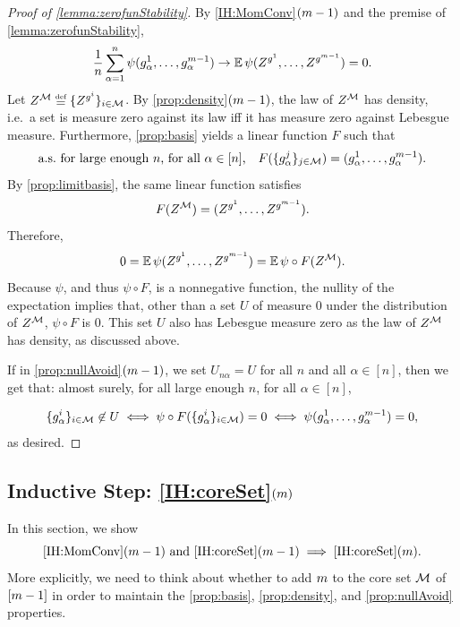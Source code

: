 \documentclass[main.tex]{subfiles}
\begin{document}
\begin{proof}[Proof of \cref{lemma:zerofunStability}]
By \ref{IH:MomConv}$(m-1)$ and the premise of \cref{lemma:zerofunStability},
\begin{align*}
\frac{1}{n} \sum_{\alpha = 1}^n \psi(g^1_\alpha, \ldots, g^{m-1}_\alpha) \to \operatorname*{\mathbb{E}} \psi(Z^{g^1}, \ldots, Z^{g^{m-1}}) = 0.
\end{align*}
Let $\Zz^\coreset \defeq \{\Zz^{g^i}\}_{i \in \coreset}$.
By \ref{prop:density}$(m-1)$, the law of $Z^{\mathcal{M}}$ has density, i.e.\ a set is measure zero against its law iff it has measure zero against Lebesgue measure.
Furthermore, \ref{prop:basis} yields a linear function $F$ such that
\[\text{a.s.\ for large enough $n$, for all $\alpha \in [n]$,}\quad
F(\{g^j_\alpha\}_{j \in \mathcal{M}}) = (g^1_\alpha, \ldots, g^{m-1}_\alpha)
.
\]
By \cref{prop:limitbasis}, the same linear function satisfies
\[F(Z^{\mathcal{M}}) = (Z^{g^1}, \ldots, Z^{g^{m-1}})
.\]
Therefore,
\begin{equation*}
0 = \operatorname*{\mathbb{E}} \psi(Z^{g^1}, \ldots, Z^{g^{m-1}})
= \operatorname*{\mathbb{E}} \psi \circ F(Z^{\mathcal{M}})
.
\end{equation*}
Because $\psi$, and thus $\psi \circ F$, is a nonnegative function, the nullity of the expectation implies that, other than a set $U$ of measure 0 under the distribution of $Z^{\mathcal{M}}$, $\psi\circ F$ is 0.
This set $U$ also has Lebesgue measure zero as the law of $Z^{\mathcal{M}}$ has density, as discussed above.

If in \ref{prop:nullAvoid}$(m-1)$, we set $U_{n\alpha} = U$ for all $n$ and all $\alpha \in [n]$, then we get that: almost surely, for all large enough $n$, for all $\alpha \in [n]$,

\begin{equation*}
\{g^i_\alpha\}_{i \in \mathcal{M}} \not\in U
\iff
\psi\circ F(\{g^i_\alpha\}_{i \in \mathcal{M}}) = 0
\iff
\psi(g^1_\alpha, \ldots, g^{m-1}_\alpha) = 0,
\end{equation*}
as desired.
\end{proof}

\subsection{Inductive Step: \ref{IH:coreSet}\texorpdfstring{$(m)$}{(m)}}
\label{sec:inductiveCoreSet}
In this section, we show
\begin{equation*}
\text{\ref{IH:MomConv}$(m-1)$ and \ref{IH:coreSet}$(m-1)$} \implies \text{\ref{IH:coreSet}}(m).
\end{equation*}
More explicitly, we need to think about whether to add $m$ to the core set $\mathcal{M}$ of $[m-1]$ in order to maintain the \ref{prop:basis}, \ref{prop:density}, and \ref{prop:nullAvoid} properties.
\end{document}
